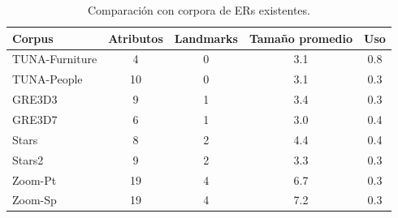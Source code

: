 \begin{table}[h]
\begin{center}
\footnotesize{

\begin{tabular} {  l c c c c}
\hline
Corpus											& Atributos			& Landmarks			& Tama\~{n}o promedio	& Uso \\
\hline
TUNA-Furniture							& 4								& 0							& 3.1				& 0.8   \\
TUNA-People									& 10							& 0							& 3.1				& 0.3   \\
GRE3D3											& 9								& 1							& 3.4				& 0.3   \\
GRE3D7											& 6								& 1							& 3.0				& 0.4   \\
Stars												& 8								& 2							& 4.4				& 0.4   \\
Stars2											& 9								& 2							& 3.3				& 0.3   \\
Zoom-Pt											& 19							& 4							& 6.7				& 0.3   \\
Zoom-Sp											& 19							& 4							& 7.2				& 0.3   \\
\hline
\end{tabular}
}
\end{center}
\caption{Comparaci\'on con corpora de ERs existentes.}
\label{tab-comparison}
\end{table}



%
%

